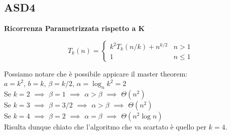 \documentclass[../cheatSheetAlgoritmi.tex]{subfiles}
\begin{document}
\subsection{ASD4}
\textbf{Ricorrenza Parametrizzata rispetto a K}
\begin{center}
	\begin{equation*}
  		T_{k}(n)=\begin{cases}
    		k^{2}T_{k}(n/k) + n^{k/2}  & \text{$n > 1$}\\
    		1 & \text{$n \leq 1$}
  		\end{cases}
	\end{equation*}
\end{center}
Possiamo notare che è possibile appicare il master theorem:\\
$a = k^{2}$, $b = k$, $\beta = k/2$, $\alpha = \log_{n}{k^{2}}= 2$\\
Se $k = 2$ $\implies$ $\beta = 1$ $\implies$ $\alpha > \beta$ $\implies$ $\Theta(n^{2})$\\
Se $k = 3$ $\implies$ $\beta = 3/2$ $\implies$ $\alpha > \beta$ $\implies$ $\Theta(n^{2})$\\
Se $k = 4$ $\implies$ $\beta = 2$ $\implies$ $\alpha = \beta$ $\implies$ $\Theta(n^{2}\log{n})$\\
Risulta dunque chiato che l'algoritmo che va scartato è quello per $k = 4$.
\end{document}
